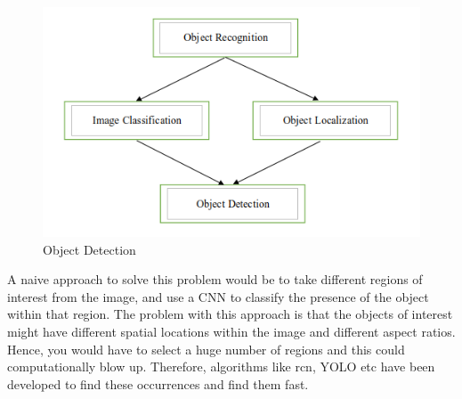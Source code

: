 \begin{figure}[H]
\centering
	\includegraphics[scale=1]{Figures/object.png}	
	\caption{Object Detection}
	\label{fig:object}
\end{figure}
A naive approach to solve this problem would be to take different regions of interest from the image, and use a CNN to classify the presence of the object within that region. The problem with this approach is that the objects of interest might have different spatial locations within the image and different aspect ratios. Hence, you would have to select a huge number of regions and this could computationally blow up. Therefore, algorithms like \acrshort{rcn}, YOLO etc have been developed to find these occurrences and find them fast.
